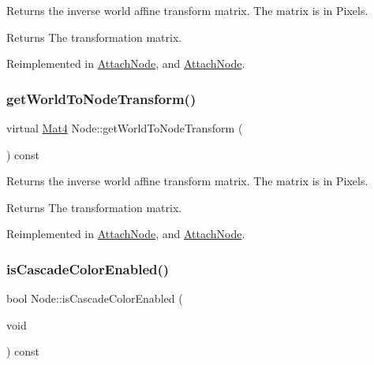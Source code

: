 Returns the inverse world affine transform matrix. The matrix is in Pixels.

\begin{DoxyReturn}{Returns}
The transformation matrix. 
\end{DoxyReturn}


Reimplemented in \hyperlink{classAttachNode_a566ef52d5a8c5f036322a4fb5f63c668}{Attach\+Node}, and \hyperlink{classAttachNode_a983b98880a9e8b42dcf78720f4fae50e}{Attach\+Node}.

\mbox{\label{classNode_a2128a1876b3f14c6270bbf0a9010a572}} 
\subsubsection{\texorpdfstring{get\+World\+To\+Node\+Transform()}{getWorldToNodeTransform()}\hspace{0.1cm}{\footnotesize\ttfamily [2/2]}}
{\footnotesize\ttfamily virtual \hyperlink{classMat4}{Mat4} Node\+::get\+World\+To\+Node\+Transform (\begin{DoxyParamCaption}{ }\end{DoxyParamCaption}) const\hspace{0.3cm}{\ttfamily [virtual]}}

Returns the inverse world affine transform matrix. The matrix is in Pixels.

\begin{DoxyReturn}{Returns}
The transformation matrix. 
\end{DoxyReturn}


Reimplemented in \hyperlink{classAttachNode_a566ef52d5a8c5f036322a4fb5f63c668}{Attach\+Node}, and \hyperlink{classAttachNode_a983b98880a9e8b42dcf78720f4fae50e}{Attach\+Node}.

\mbox{\label{classNode_abf874f1b388e773ca80732b1134508be}} 
\subsubsection{\texorpdfstring{is\+Cascade\+Color\+Enabled()}{isCascadeColorEnabled()}\hspace{0.1cm}{\footnotesize\ttfamily [1/2]}}
{\footnotesize\ttfamily bool Node\+::is\+Cascade\+Color\+Enabled (\begin{DoxyParamCaption}\item[{void}]{ }\end{DoxyParamCaption}) const\hspace{0.3cm}{\ttfamily [virtual]}}

